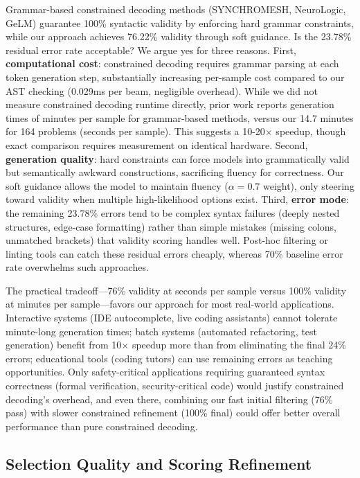 Grammar-based constrained decoding methods (SYNCHROMESH, NeuroLogic, GeLM) guarantee 100\% syntactic validity by enforcing hard grammar constraints, while our approach achieves 76.22\% validity through soft guidance. Is the 23.78\% residual error rate acceptable? We argue yes for three reasons. First, \textbf{computational cost}: constrained decoding requires grammar parsing at each token generation step, substantially increasing per-sample cost compared to our AST checking (0.029ms per beam, negligible overhead). While we did not measure constrained decoding runtime directly, prior work reports generation times of minutes per sample for grammar-based methods, versus our 14.7 minutes for 164 problems (seconds per sample). This suggests a 10-20$\times$ speedup, though exact comparison requires measurement on identical hardware. Second, \textbf{generation quality}: hard constraints can force models into grammatically valid but semantically awkward constructions, sacrificing fluency for correctness. Our soft guidance allows the model to maintain fluency ($\alpha=0.7$ weight), only steering toward validity when multiple high-likelihood options exist. Third, \textbf{error mode}: the remaining 23.78\% errors tend to be complex syntax failures (deeply nested structures, edge-case formatting) rather than simple mistakes (missing colons, unmatched brackets) that validity scoring handles well. Post-hoc filtering or linting tools can catch these residual errors cheaply, whereas 70\% baseline error rate overwhelms such approaches.

The practical tradeoff---76\% validity at seconds per sample versus 100\% validity at minutes per sample---favors our approach for most real-world applications. Interactive systems (IDE autocomplete, live coding assistants) cannot tolerate minute-long generation times; batch systems (automated refactoring, test generation) benefit from 10$\times$ speedup more than from eliminating the final 24\% errors; educational tools (coding tutors) can use remaining errors as teaching opportunities. Only safety-critical applications requiring guaranteed syntax correctness (formal verification, security-critical code) would justify constrained decoding's overhead, and even there, combining our fast initial filtering (76\% pass) with slower constrained refinement (100\% final) could offer better overall performance than pure constrained decoding.

\subsection{Selection Quality and Scoring Refinement}

